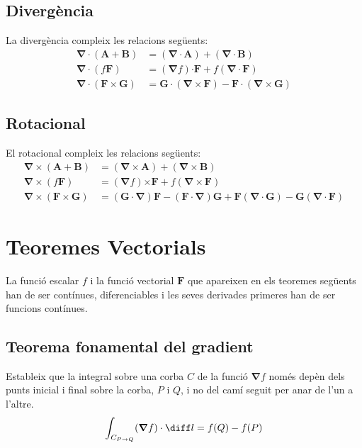 \documentclass[catalan,a4paper,twoside,11pt]{article}
\begin{document}
\subsection{Divergència}
La divergència compleix les relacions següents:
\begin{align}
    \boldsymbol{\nabla\cdot}(\boldsymbol{A}+\boldsymbol{B}) &= (\boldsymbol{\nabla\cdot A}) +
    (\boldsymbol{\nabla\cdot B})\\
    \boldsymbol{\nabla\cdot}(f\boldsymbol{F}) &=
    (\boldsymbol{\nabla}f)\boldsymbol{\cdot F} + f(\boldsymbol{\nabla\cdot F})\\
       \boldsymbol{\nabla\cdot}(\boldsymbol{F\times G}) &=
    \boldsymbol{G\cdot}(\boldsymbol{\nabla\times F}) -
    \boldsymbol{F\cdot}(\boldsymbol{\nabla\times G})
\end{align}

\subsection{Rotacional}
El rotacional compleix les relacions següents:
\begin{align}
    \boldsymbol{\nabla\times}(\boldsymbol{A}+\boldsymbol{B}) &= (\boldsymbol{\nabla\times A}) + (\boldsymbol{\nabla\times B})\\
    \boldsymbol{\nabla\times}(f\boldsymbol{F}) &=
    (\boldsymbol{\nabla}f)\boldsymbol{\times F} + f(\boldsymbol{\nabla\times F})\\
    \boldsymbol{\nabla\times}(\boldsymbol{F\times G}) &= (\boldsymbol{G\cdot\nabla})\boldsymbol{F} - (\boldsymbol{F\cdot\nabla})\boldsymbol{G} + \boldsymbol{F}(\boldsymbol{\nabla\cdot G}) - \boldsymbol{G}(\boldsymbol{\nabla\cdot F})
\end{align}


\section{Teoremes Vectorials}

La funció escalar $f$ i la funció vectorial $\boldsymbol{F}$ que apareixen en els teoremes següents han de ser contínues, diferenciables i les seves derivades primeres han de ser funcions contínues.

\subsection{Teorema fonamental del gradient}
Estableix que la integral sobre una corba $C$ de la funció $\boldsymbol{\nabla} f$ només depèn dels punts inicial i final sobre la corba, $P$ i $Q$, i no del camí seguit per anar de l'un a l'altre.
\begin{equation}
    \int_{C_{P\rightarrow Q}} (\boldsymbol{\nabla}f) \cdot \diff l = f(Q)-f(P)
\end{equation}
\end{document}
